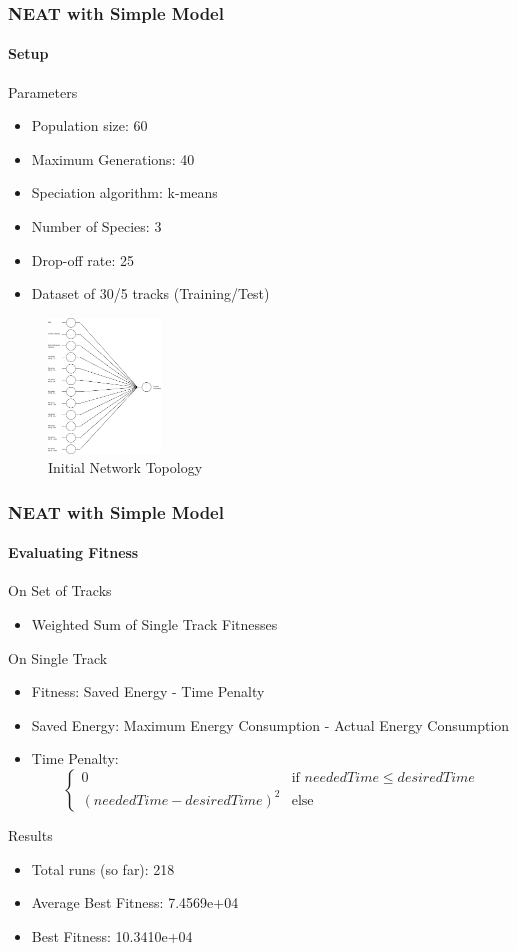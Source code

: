 \documentclass[8pt]{beamer}
\begin{document}
\begin{frame}
	\frametitle{NEAT with Simple Model}
	\framesubtitle{Setup}
	\begin{block}{Parameters}
		\begin{itemize}
			\item Population size: 60
			\item Maximum Generations: 40
			\item Speciation algorithm: k-means
			\item Number of Species: 3
			\item Drop-off rate: 25
			\item Dataset of 30/5 tracks (Training/Test)
		\end{itemize}
	\end{block}
	\begin{figure}[c]	
		\includegraphics[width=3cm]{images/topology.jpeg}
		\caption{Initial Network Topology}
	\end{figure}
\end{frame}

\begin{frame}
	\frametitle{NEAT with Simple Model}
	\framesubtitle{Evaluating Fitness}
	\begin{block}{On Set of Tracks}
		\begin{itemize}
			\item Weighted Sum of Single Track Fitnesses
		\end{itemize}
	\end{block}
	\begin{block}{On Single Track}
		\begin{itemize}		
			\item Fitness: Saved Energy - Time Penalty
			\item Saved Energy: Maximum Energy Consumption - Actual Energy Consumption
			\item Time Penalty: \[\left\{ 
				\begin{array}{ll}
					0  & \mbox{if } neededTime \leq desiredTime \\
					(neededTime - desiredTime)^2 & \mbox{else } 
				\end{array}			
			\right. \]			
		\end{itemize}
	\end{block}	
	\begin{block}{Results}
	\begin{itemize}
		\item Total runs (so far): 218
		\item Average Best Fitness: 7.4569e+04
		\item Best Fitness: 10.3410e+04
	\end{itemize}
	\end{block}
	
\end{frame}
\end{document}

